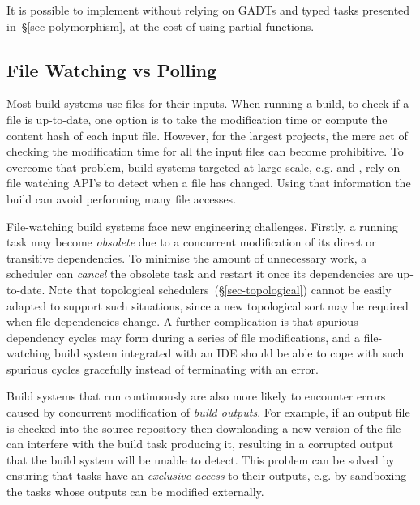 \noindent
It is possible to implement  without relying on GADTs and typed
tasks presented in~\S\ref{sec-polymorphism}, at the cost of using partial
functions.

\subsection{File Watching vs Polling}\label{sec-file-watching}

Most build systems use files for their inputs. When running a build, to check if
a file is up-to-date, one option is to take the modification time or compute the
content hash of each input file. However, for the largest projects, the mere act
of checking the modification time for all the input files can become
prohibitive. To overcome that problem, build systems targeted at large scale,
e.g. \Bazel and \Buck, rely on file watching API's to detect when a file has
changed. Using that information the build can avoid performing many file
accesses.

File-watching build systems face new engineering challenges. Firstly, a running
task may become \emph{obsolete} due to a concurrent modification of its direct
or transitive dependencies. To minimise the amount of unnecessary work, a
scheduler can \emph{cancel} the obsolete task and restart it once its
dependencies are up-to-date. Note that topological
schedulers~(\S\ref{sec-topological}) cannot be easily adapted to support such
situations, since a new topological sort may be required when file dependencies
change. A further complication is that spurious dependency cycles may form
during a series of file modifications, and a file-watching build system
integrated with an IDE should be able to cope with such spurious cycles
gracefully instead of terminating with an error.

Build systems that run continuously are also more likely to encounter errors
caused by concurrent modification of \emph{build outputs}. For example, if an
output file is checked into the source repository then downloading a new
version of the file can interfere with the build task producing it, resulting
in a corrupted output that the build system will be unable to detect. This
problem can be solved by ensuring that tasks have an \emph{exclusive access}
to their outputs, e.g. by sandboxing the tasks whose outputs can be modified
externally.
